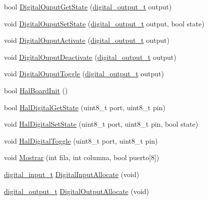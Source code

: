 \begin{DoxyCompactItemize}
\item 
bool \hyperlink{group__hal_gaba02fd1cdd0a19d04cd5d24aa148193e}{Digital\+Ouput\+Get\+State} (\hyperlink{group___plantilla_ga3e63b19d3d0dbfbfb2c50b3ac1f69aa0}{digital\+\_\+output\+\_\+t} output)
\item 
void \hyperlink{group__hal_ga0483a65cba06b635483c4c7749552dd1}{Digital\+Ouput\+Set\+State} (\hyperlink{group___plantilla_ga3e63b19d3d0dbfbfb2c50b3ac1f69aa0}{digital\+\_\+output\+\_\+t} output, bool state)
\item 
void \hyperlink{group__hal_gab19a43c015776dc20c406c14e0d3d481}{Digital\+Ouput\+Activate} (\hyperlink{group___plantilla_ga3e63b19d3d0dbfbfb2c50b3ac1f69aa0}{digital\+\_\+output\+\_\+t} output)
\item 
void \hyperlink{group__hal_gafddace812c99bbfd8455f7a9a2d9e6f9}{Digital\+Ouput\+Deactivate} (\hyperlink{group___plantilla_ga3e63b19d3d0dbfbfb2c50b3ac1f69aa0}{digital\+\_\+output\+\_\+t} output)
\item 
void \hyperlink{group__hal_gaa8e0bc6b2e09229fad9a738b32208e9f}{Digital\+Ouput\+Toggle} (\hyperlink{group___plantilla_ga3e63b19d3d0dbfbfb2c50b3ac1f69aa0}{digital\+\_\+output\+\_\+t} output)
\item 
bool \hyperlink{group__hal_ga37ebfca95548aba0848e1a21c050f11a}{Hal\+Board\+Init} ()
\item 
bool \hyperlink{group__hal_gabb9c91076227523e285aa398a7156598}{Hal\+Digital\+Get\+State} (uint8\+\_\+t port, uint8\+\_\+t pin)
\item 
void \hyperlink{group__hal_ga39d2ad5555371ff5f398232bac297c27}{Hal\+Digital\+Set\+State} (uint8\+\_\+t port, uint8\+\_\+t pin, bool state)
\item 
void \hyperlink{group__hal_ga2c201a4dc2dbf1edddd7e217dae998f2}{Hal\+Digital\+Toggle} (uint8\+\_\+t port, uint8\+\_\+t pin)
\item 
void \hyperlink{group__hal_ga7e9fb7e2720d8c47b1a8d14d7857b5c1}{Mostrar} (int fila, int columna, bool puerto\mbox{[}8\mbox{]})
\item 
\hyperlink{group__hal_gaa88780f43e331bbd1d6069d75ad68fcf}{digital\+\_\+input\+\_\+t} \hyperlink{group__hal_gaf1b5f5495ccca4acd64ff693392702b1}{Digital\+Input\+Allocate} (void)
\item 
\hyperlink{group___plantilla_ga3e63b19d3d0dbfbfb2c50b3ac1f69aa0}{digital\+\_\+output\+\_\+t} \hyperlink{group__hal_ga3b2fffa289b1c6487cb7be064252fb5e}{Digital\+Output\+Allocate} (void)
\end{DoxyCompactItemize}

